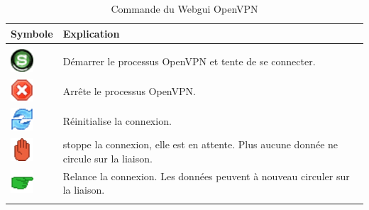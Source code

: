 \begin{description}
  \begin{table}[!h]
    \begin{tabular}{lp{12cm}}
      Symbole                                        & Explication \\
      \hline                                                            \\
      \includegraphics[width=24pt]{start}            & Démarrer le processus OpenVPN et tente de se connecter. \\
      \includegraphics[width=24pt]{stop}             & Arrête le processus OpenVPN. \\
      \includegraphics[width=24pt]{reload}           & Réinitialise la connexion. \\
      \includegraphics[width=24pt]{hold}             & stoppe la connexion, elle est en attente. Plus aucune donnée ne circule sur la liaison. \\
      \includegraphics[width=24pt]{release}          & Relance la connexion. Les données peuvent à nouveau circuler sur la liaison. \\
      \hline                                                            \\
    \end{tabular}
  \caption{Commande du Webgui OpenVPN}
\end{table}
\end{description}

